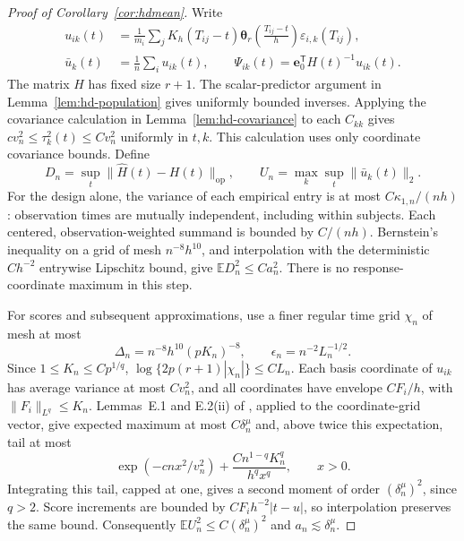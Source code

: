 \documentclass[10pt]{book}
\newcommand{\be}{{\mathbf e}}
\newcommand{\btheta}  {\boldsymbol{\theta}}
\newcommand{\expect}{\mathbb{E}}
\newcommand{\trans}{{\scriptscriptstyle\mathsf{T}}}
\numberwithin{equation}{section}
\begin{document}
\begin{proof}[Proof of Corollary~\ref{cor:hdmean}]
Write
\[
\begin{aligned}
u_{ik}(t)&=\frac1{m_i}\sum_j K_h(T_{ij}-t)
\btheta_r\!\left(\frac{T_{ij}-t}{h}\right)\varepsilon_{i,k}(T_{ij}),\\
\bar u_k(t)&=\frac1n\sum_i u_{ik}(t),\qquad
\Psi_{ik}(t)=\be_0^\trans H(t)^{-1}u_{ik}(t).
\end{aligned}
\]
The matrix $H$ has fixed size $r+1$. The scalar-predictor argument in
Lemma~\ref{lem:hd-population} gives uniformly bounded inverses.
Applying the covariance calculation in Lemma~\ref{lem:hd-covariance}
to each $C_{kk}$ gives
$cv_n^2\le\tau_k^2(t)\le Cv_n^2$ uniformly in $t,k$.
This calculation uses only coordinate covariance bounds.
Define
\[
D_n=\sup_t\|\widehat H(t)-H(t)\|_{\mathrm{op}},
\qquad U_n=\max_k\sup_t\|\bar u_k(t)\|_2 .
\]
For the design alone, the variance of each empirical entry is at most
$C\kappa_{1,n}/(nh)$: observation times are mutually independent,
including within subjects. Each centered, observation-weighted summand
is bounded by $C/(nh)$. Bernstein's inequality on a grid of mesh
$n^{-8}h^{10}$, and interpolation with the deterministic $Ch^{-2}$
entrywise Lipschitz bound, give
$\expect D_n^2\le Ca_n^2$. There is no response-coordinate maximum
in this step.

For scores and subsequent approximations, use a finer regular time grid
$\chi_n$ of mesh at most
\[
\Delta_n=n^{-8}h^{10}(pK_n)^{-8},\qquad
\epsilon_n=n^{-2}L_n^{-1/2}.
\]
Since $1\le K_n\le Cp^{1/q}$,
$\log\{2p(r+1)|\chi_n|\}\le CL_n$.
Each basis coordinate of $u_{ik}$ has average variance at most
$Cv_n^2$, and all coordinates have envelope $CF_i/h$, with
$\|F_i\|_{L^q}\le K_n$. Lemmas~E.1 and E.2(ii) of
\citet{chernozhukov_central_2017}, applied to the coordinate-grid
vector, give expected maximum at most $C\delta_n^\mu$ and, above
twice this expectation, tail at most
\[
\exp(-cnx^2/v_n^2)+
\frac{Cn^{1-q}K_n^q}{h^q x^q},\qquad x>0.
\]
Integrating this tail, capped at one, gives a second moment of order
$(\delta_n^\mu)^2$, since $q>2$. Score increments are bounded by
$CF_i h^{-2}|t-u|$, so interpolation preserves the same bound.
Consequently $\expect U_n^2\le C(\delta_n^\mu)^2$ and
$a_n\lesssim\delta_n^\mu$.


\end{proof}
\end{document}
